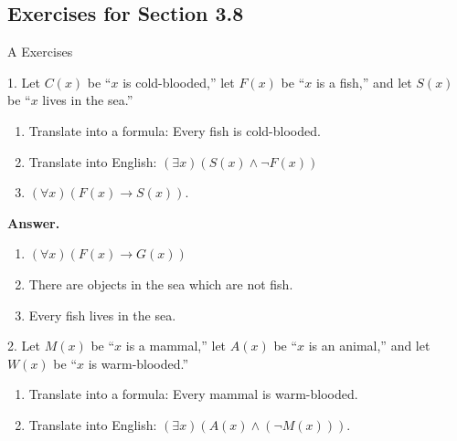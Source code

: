 \documentclass[10pt,]{book}
\theoremstyle{plain}
\theoremstyle{definition}
\theoremstyle{definition}
\theoremstyle{definition}
\theoremstyle{definition}
\begin{document}
\subsection[Exercises for Section 3.8 ]{Exercises for Section 3.8 }\label{exercises-3.8}
\hypertarget{exercisegroup-12}{}\typeout{************************************************}
\typeout{************************************************}
A Exercises%
\begin{exercisegroup}
\item[1.]\hypertarget{exercise-52}{} Let \(C(x)\) be ``\(x\) is cold-blooded,'' let \(F(x)\) be ``\(x\) is a fish,'' and let \(S(x)\) be ``\(x\) lives in the sea.''%
\par
\leavevmode%
\begin{enumerate}[label=\alph*]
\item\hypertarget{li-292}{}Translate into a formula: Every fish is cold-blooded.%
\item\hypertarget{li-293}{}Translate into English: \((\exists x)(S(x) \land  \neg F(x))\)%
\item\hypertarget{li-294}{} \((\forall x)(F(x) \rightarrow  S(x))\).%
\end{enumerate}

%
\par\smallskip
\par\smallskip
\noindent\textbf{Answer.}\hypertarget{answer-23}{}\quad
\leavevmode%
\begin{enumerate}[label=\alph*]
\item\hypertarget{li-295}{} \((\forall x)(F(x)\to G(x))\)%
\item\hypertarget{li-296}{} There are objects in the sea which are not fish.%
\item\hypertarget{li-297}{}Every fish lives in the sea. %
\end{enumerate}
%
\item[2.]\hypertarget{exercise-53}{}Let \(M(x)\) be ``\(x\) is a mammal,'' let \(A(x)\) be ``\(x\) is an animal,'' and let \(W(x)\) be ``\(x\) is warm-blooded.''%
\par
\leavevmode%
\begin{enumerate}[label=\alph*]
\item\hypertarget{li-298}{}Translate into a formula: Every mammal is warm-blooded.%
\item\hypertarget{li-299}{}Translate into English: \((\exists x)(A(x) \land  (\neg M(x)))\).%
\end{enumerate}


\end{exercisegroup}
\end{document}

